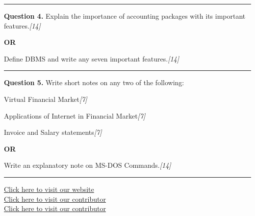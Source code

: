 \documentclass[11pt,a4paper]{article}
\newcommand{\pts}[1]{\hfill   \textit{[#1]}}
\begin{document}
\medskip\rule{\linewidth}{0.2pt}




\noindent   \textbf{Question 4.}
Explain the importance of accounting packages with its important features.\pts{14}

\centerline{   \textbf{OR}}

Define DBMS and write any seven important features.\pts{14}

\medskip\rule{\linewidth}{0.2pt}




\noindent   \textbf{Question 5.}
Write short notes on any two of the following:

\begin{parts}
  \item Virtual Financial Market\pts{7}
  \item Applications of Internet in Financial Market\pts{7}
  \item Invoice and Salary statements\pts{7}
\end{parts}

\centerline{   \textbf{OR}}

Write an explanatory note on MS-DOS Commands.\pts{14}

\vfill
\rule{\linewidth}{0.4pt}

\begin{center}\small
\href{https://bhu-exam.vercel.app/}{Click here to visit our website}\\[4pt]
\href{https://me-aryan.vercel.app/}{Click here to visit our contributor}\\[4pt]
\href{https://quashan-me.vercel.app/}{Click here to visit our contributor}
\end{center}
\end{document}
